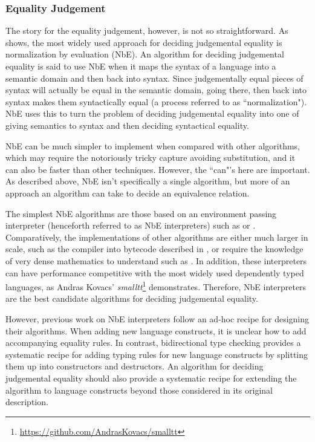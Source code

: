 \documentclass{article}
\begin{document}
\subsubsection{Equality Judgement}

The story for the equality judgement, however, is not so straightforward.
As \citet{Abel2013} shows, the most widely used approach for deciding judgemental equality is normalization by evaluation (NbE).
An algorithm for deciding judgemental equality is said to use NbE when it maps the syntax of a language into a semantic domain and then back into syntax.
Since judgementally equal pieces of syntax will actually be equal in the semantic domain, going there, then back into syntax makes them syntactically equal (a process referred to as ``normalization").
NbE uses this to turn the problem of deciding judgemental equality into one of giving semantics to syntax and then deciding syntactical equality.

NbE can be much simpler to implement when compared with other algorithms, which may require the notoriously tricky capture avoiding substitution, and it can also be faster than other techniques.
However, the ``can"'s here are important.
As described above, NbE isn't specifically a single algorithm, but more of an approach an algorithm can take to decide an equivalence relation.

The simplest NbE algorithms are those based on an environment passing interpreter (henceforth referred to as NbE interpreters) such as \citet{Coquand1996} or \citet{Chapman2005}.
Comparatively, the implementations of other algorithms are either much larger in scale, such as the compiler into bytecode described in \citet{Grgoire2002}, or require the knowledge of very dense mathematics to understand such as \citet{Ahman2013}.
In addition, these interpreters can have performance competitive with the most widely used dependently typed languages, as Andras Kovacs' \textit{smalltt}\footnote{\url{https://github.com/AndrasKovacs/smalltt}} demonstrates.
Therefore, NbE interpreters are the best candidate algorithms for deciding judgemental equality.

However, previous work on NbE interpreters follow an ad-hoc recipe for designing their algorithms.
When adding new language constructs, it is unclear how to add accompanying equality rules.
In contrast, bidirectional type checking provides a systematic recipe for adding typing rules for new language constructs by splitting them up into constructors and destructors.
An algorithm for deciding judgemental equality should also provide a systematic recipe for extending the algorithm to language constructs beyond those considered in its original description.
\end{document}
